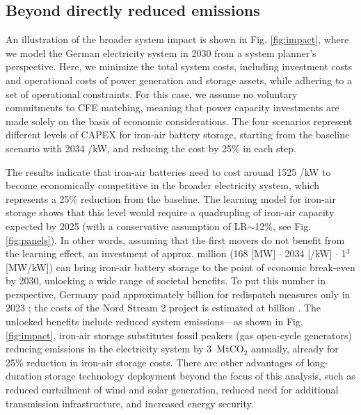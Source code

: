 \documentclass[pdflatex,sn-basic, Numbered]{sn-jnl}
\theoremstyle{thmstyleone}%
\theoremstyle{thmstyletwo}%
\theoremstyle{thmstylethree}%
\begin{document}
\subsection*{Beyond directly reduced emissions}\label{sec4}

An illustration of the broader system impact is shown in Fig. \ref{fig:impact}, where we model the German electricity system in 2030 from a system planner's perspective. Here, we minimize the total system costs, including investment costs and operational costs of power generation and storage assets, while adhering to a set of operational constraints. For this case, we assume no voluntary commitments to CFE matching, meaning that power capacity investments are made solely on the basis of economic considerations. The four scenarios represent different levels of CAPEX for iron-air battery storage, starting from the baseline scenario with 2034 \officialeuro/kW, and reducing the cost by 25\% in each step.

The results indicate that iron-air batteries need to cost around 1525 \officialeuro/kW to become economically competitive in the broader electricity system, which represents a 25\% reduction from the baseline. The learning model for iron-air storage shows that this level would require a quadrupling of iron-air capacity expected by 2025 (with a conservative assumption of LR$\sim$12\%, see Fig. \ref{fig:panels}). In other words, assuming that the first movers do not benefit from the learning effect, an investment of approx.  million (168 [MW] $\cdot$ 2034 [\officialeuro/kW] $\cdot$ 1$^3$ [MW/kW]) can bring iron-air battery storage to the point of economic break-even by 2030, unlocking a wide range of societal benefits. To put this number in perspective, Germany paid approximately  billion for redispatch measures only in 2023 \cite{titzIdentifyingDriversMitigators2024, bnetzaBundesnetzagenturMonitoringberichte2023}; the  costs of the Nord Stream 2 project is estimated at  billion \cite{cleanenergywireNordStreamSymbol2018}. The unlocked benefits include reduced system emissions---as shown in Fig. \ref{fig:impact}, iron-air storage substitutes fossil peakers (gas open-cycle generators) reducing emissions in the electricity system by 3~MtCO$_2$ annually, already for 25\% reduction in iron-air storage costs. There are other advantages of long-duration storage technology deployment beyond the focus of this analysis, such as reduced curtailment of wind and solar generation, reduced need for additional transmission infrastructure, and increased energy security.
\end{document}

